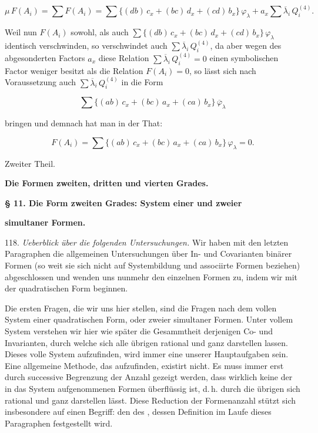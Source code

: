 \[
\mu\,F(A_i) = \sum F(A_i) = \sum \{(db)\,c_x + (bc)\,d_x + (cd)\,b_x\}\,\varphi_\lambda + a_x \sum \overline{\lambda}_i\,Q_i^{(4)}.
\]

Weil nun $F(A_i)$ sowohl, als auch $\sum \{(db)\,c_x + (bc)\,d_x + (cd)\,b_x\}\,\varphi_\lambda$
identisch verschwinden, so verschwindet auch $\sum \overline{\lambda}_i\,Q_i^{(4)}$,
da aber wegen des abgesonderten Factors $a_x$ diese Relation
$\sum \overline{\lambda}_i\,Q_i^{(4)} = 0$ einen symbolischen Factor weniger besitzt
als die Relation $F(A_i) = 0$, so lässt sich nach Voraussetzung auch
$\sum \overline{\lambda}_i\,Q_i^{(4)}$ in die Form

\[
\sum \{(ab)\,c_x + (bc)\,a_x + (ca)\,b_x\}\,\overline{\varphi}_\lambda
\]

bringen und demnach hat man in der That:

\[
F(A_i) = \sum \{(ab)\,c_x + (bc)\,a_x + (ca)\,b_x\}\,\varphi_\lambda = 0.
\]




\begin{center}
Zweiter Theil.

\textbf{Die Formen zweiten, dritten und vierten Grades.}
\end{center}

\begin{center}
\textbf{§ 11. Die Form zweiten Grades: System einer und zweier}

\textbf{simultaner Formen.}
\end{center}

118. \textit{Ueberblick über die folgenden Untersuchungen.} Wir haben mit
den letzten Paragraphen die allgemeinen Untersuchungen über In- und
Covarianten binärer Formen (so weit sie sich nicht auf Systembildung
und associirte Formen beziehen) abgeschlossen und wenden uns nunmehr
den einzelnen Formen zu, indem wir mit der quadratischen Form
beginnen.

Die ersten Fragen, die wir uns hier stellen, sind die Fragen nach
dem vollen System einer quadratischen Form, oder zweier simultaner
Formen. Unter vollem System verstehen wir hier wie später die Gesammtheit
derjenigen Co- und Invarianten, durch welche sich alle übrigen
rational und ganz darstellen lassen. Dieses volle System aufzufinden,
wird immer eine unserer Hauptaufgaben sein. Eine allgemeine Methode,
das  aufzufinden, existirt nicht. Es muss immer
erst durch successive Begrenzung der Anzahl gezeigt werden, dass
wirklich keine der in das System aufgenommenen Formen überflüssig
ist, d.\,h. durch die übrigen sich rational und ganz darstellen lässt.
Diese Reduction der Formenanzahl stützt sich insbesondere auf einen
Begriff: den des , dessen Definition im Laufe dieses
Paragraphen festgestellt wird.

